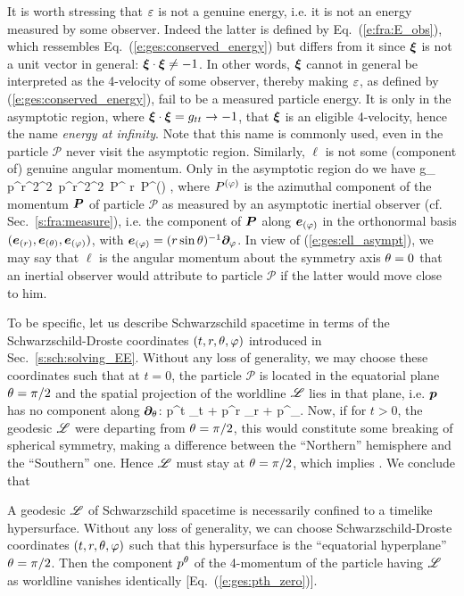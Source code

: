 It is worth stressing that $\varepsilon$ is not a genuine energy, i.e. it is not
an energy measured by some observer. Indeed the latter is defined by
Eq.~(\ref{e:fra:E_obs}), which ressembles Eq.~(\ref{e:ges:conserved_energy})
but differs from it since $\bm{\xi}$ is not a unit vector in general:
$\bm{\xi}\cdot\bm{\xi} \not = -1$. In other words, $\bm{\xi}$ cannot in general
be interpreted as the 4-velocity of some observer, thereby making
$\varepsilon$, as defined by (\ref{e:ges:conserved_energy}), fail to be a measured
particle energy. It is only in the asymptotic region, where $\bm{\xi}\cdot\bm{\xi} = g_{tt}
\rightarrow -1$, that $\bm{\xi}$ is an eligible 4-velocity, hence the name
\emph{energy at infinity}. Note that this name is commonly used, even in the
particle $\mathscr{P}$ never visit the asymptotic region.
Similarly, $\ell$ is not some (component of) genuine angular momentum. Only in the
asymptotic region do we have
\be \label{e:ges:ell_asympt}
    \ell \simeq g_{\ph\ph} \, p^\ph \simeq r^2\sin^2\ph \, p^\ph \simeq r^2\sin^2\theta \, P^\ph
    \simeq r\sin\th \, P^{(\ph)} ,
\ee
where $P^{(\varphi)}$ is the azimuthal component of the momentum $\bm{P}$ of particle $\mathscr{P}$
as measured by an asymptotic inertial observer (cf. Sec.~\ref{s:fra:measure}), i.e.
the component of $\bm{P}$ along $\bm{e}_{(\varphi)}$ in the orthonormal basis $(\bm{e}_{(r)}, \bm{e}_{(\theta)}, \bm{e}_{(\varphi)})$, with $\bm{e}_{(\varphi)} = (r\sin\theta)^{-1} \bm{\partial}_\varphi$.
In view of (\ref{e:ges:ell_asympt}), we may say that $\ell$ is the angular momentum
about the symmetry axis $\theta=0$ that an inertial observer would attribute to
particle $\mathscr{P}$ if the latter would move close to him.

To be specific, let us describe Schwarzschild spacetime in terms of the
Schwarzschild-Droste coordinates $(t,r,\theta,\varphi)$ introduced in Sec.~\ref{s:sch:solving_EE}.
Without any loss of generality, we may choose these coordinates such that
at $t=0$, the particle $\mathscr{P}$ is located in the equatorial plane $\theta=\pi/2$ and
the spatial projection of the worldline $\mathscr{L}$ lies in that plane, i.e. $\bm{p}$ has
no component along $\bm{\partial}_\theta$:
\be
      p^t \wpar_{t} + p^r \wpar_r + p^\ph \wpar_\ph .
\ee
Now, if for $t>0$, the geodesic $\mathscr{L}$ were departing from $\theta=\pi/2$, this
would constitute some breaking of spherical symmetry, making a difference
between the ``Northern'' hemisphere and the ``Southern'' one. Hence $\mathscr{L}$
must stay at $\theta=\pi/2$, which implies
\be \label{e:ges:pth_zero}
     .
\ee
We conclude that
\begin{greybox}
A geodesic $\mathscr{L}$ of Schwarzschild spacetime is necessarily confined to a timelike hypersurface.
Without any loss of generality, we can choose Schwarzschild-Droste coordinates $(t,r,\theta,\varphi)$
such that this hypersurface is the ``equatorial hyperplane'' $\theta=\pi/2$.
Then the component $p^\theta$ of the 4-momentum of the particle having $\mathscr{L}$ as worldline
vanishes identically [Eq.~(\ref{e:ges:pth_zero})].
\end{greybox}

